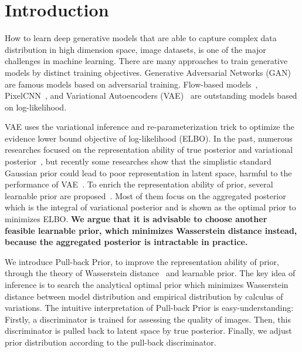 \section{Introduction}

How to learn deep generative models that are able to capture complex data distribution in high dimension space, \EG image datasets, is one of the major challenges in machine learning. There are many approaches to train generative models by distinct training objectives. Generative Adversarial Networks (GAN)~\cite{goodfellow2014generative} are famous models based on adversarial training. Flow-based models~\cite{dinh2016density,kingma2018glow}, PixelCNN~\cite{van2016conditional}, and Variational Autoencoders (VAE)~\cite{kingma2014auto,rezende_stochastic_2014} are outstanding models based on log-likelihood. 

VAE uses the variational inference and re-parameterization trick to optimize the evidence lower bound objective of log-likelihood (ELBO). In the past, numerous researches focused on the representation ability of true posterior and variational posterior~\cite{kingma2016improved,tomczak2016improving}, but recently some researches show that the simplistic standard Gaussian prior could lead to poor representation in latent space, harmful to the performance of VAE~\cite{tomczak2018vae}. To enrich the representation ability of prior, several learnable prior are proposed~\cite{tomczak2018vae,bauer2019resampled,takahashi2019variational}. Most of them focus on the aggregated posterior which is the integral of variational posterior and is shown as the optimal prior to minimizes ELBO. \textbf{We argue that it is advisable to choose another feasible learnable prior, which minimizes Wasserstein distance instead, because the aggregated posterior is intractable in practice. } 

We introduce Pull-back Prior, to improve the representation ability of prior, through the theory of Wasserstein distance~\cite{arjovsky2017wasserstein} and learnable prior. The key idea of inference is to search the analytical optimal prior which minimizes Wasserstein distance between model distribution and empirical distribution by calculus of variations. 
The intuitive interpretation of Pull-back Prior is easy-understanding: Firstly, a discriminator is trained for assessing the quality of images. Then, this discriminator is pulled back to latent space by true posterior. Finally, we adjust prior distribution according to the pull-back discriminator. 

